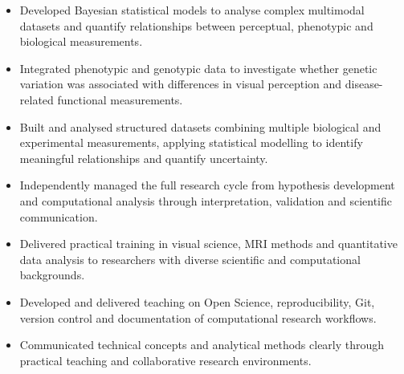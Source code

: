 \documentclass[10pt,a4paper]{article}
\begin{document}

\begin{itemize}

    \item Developed Bayesian statistical models to analyse complex
    multimodal datasets and quantify relationships between perceptual,
    phenotypic and biological measurements.

    \item Integrated phenotypic and genotypic data to investigate whether
    genetic variation was associated with differences in visual perception
    and disease-related functional measurements.

    \item Built and analysed structured datasets combining multiple
    biological and experimental measurements, applying statistical
    modelling to identify meaningful relationships and quantify uncertainty.

    \item Independently managed the full research cycle from hypothesis
    development and computational analysis through interpretation,
    validation and scientific communication.

\end{itemize}



\begin{itemize}

    \item Delivered practical training in visual science, MRI methods and
    quantitative data analysis to researchers with diverse scientific and
    computational backgrounds.

    \item Developed and delivered teaching on Open Science, reproducibility,
    Git, version control and documentation of computational research
    workflows.

    \item Communicated technical concepts and analytical methods clearly
    through practical teaching and collaborative research environments.

\end{itemize}

\end{document}
